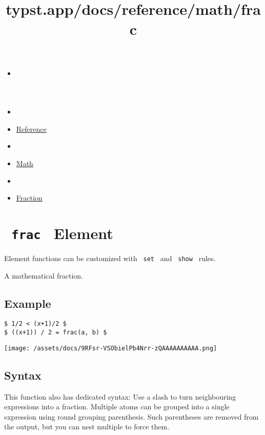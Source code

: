 \title{typst.app/docs/reference/math/frac}

\begin{itemize}
\tightlist
\item
  \href{/docs}{}
\item
  
\item
  \href{/docs/reference/}{Reference}
\item
  
\item
  \href{/docs/reference/math/}{Math}
\item
  
\item
  \href{/docs/reference/math/frac/}{Fraction}
\end{itemize}

\section{\texorpdfstring{\texttt{\ frac\ } {{ Element
}}}{ frac   Element }}\label{summary}

\label{element-tooltip}
Element functions can be customized with \texttt{\ set\ } and
\texttt{\ show\ } rules.

A mathematical fraction.

\subsection{Example}\label{example}

\begin{verbatim}
$ 1/2 < (x+1)/2 $
$ ((x+1)) / 2 = frac(a, b) $
\end{verbatim}

\texttt{[image: /assets/docs/9RFsr-VSObielPb4Nrr-zQAAAAAAAAAA.png]}

\subsection{Syntax}\label{syntax}

This function also has dedicated syntax: Use a slash to turn
neighbouring expressions into a fraction. Multiple atoms can be grouped
into a single expression using round grouping parenthesis. Such
parentheses are removed from the output, but you can nest multiple to
force them.

